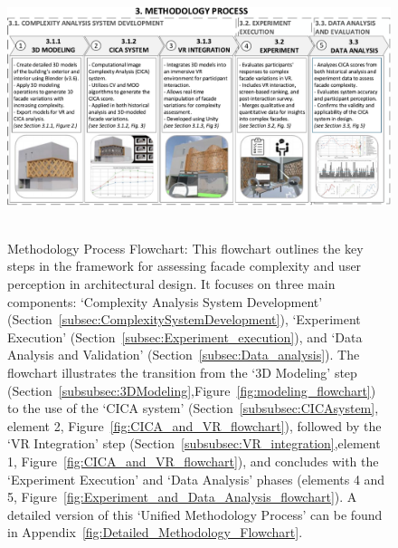 \begin{linenumbers}
\begin{figure}[!htb]
\centering
\includegraphics[width=\linewidth]{Images/MethodologyFlowchart}~
\caption{
Methodology Process Flowchart: This flowchart outlines the key steps in the framework for assessing facade complexity and user perception in architectural design. It focuses on three main components: `Complexity Analysis System Development' (Section~\ref{subsec:ComplexitySystemDevelopment}), `Experiment Execution' (Section~\ref{subsec:Experiment_execution}), and `Data Analysis and Validation' (Section~\ref{subsec:Data_analysis}). The flowchart illustrates the transition from the `3D Modeling' step (Section~\ref{subsubsec:3DModeling},Figure~\ref{fig:modeling_flowchart}) to the use of the `CICA system' (Section~\ref{subsubsec:CICAsystem}, element 2, Figure~\ref{fig:CICA_and_VR_flowchart}), followed by the `VR Integration' step (Section~\ref{subsubsec:VR_integration},element 1, Figure~\ref{fig:CICA_and_VR_flowchart}), and concludes with the `Experiment Execution' and `Data Analysis' phases (elements 4 and 5, Figure~\ref{fig:Experiment_and_Data_Analysis_flowchart}). A detailed version of this `Unified Methodology Process' can be found in Appendix~\ref{fig:Detailed_Methodology_Flowchart}.
}
\label{fig:MethodologyFlowchartComplexity}
\end{figure}


\end{linenumbers}
